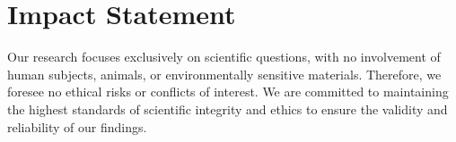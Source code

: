 \section*{Impact Statement}
Our research focuses exclusively on scientific questions, with no involvement of human subjects, animals, or environmentally sensitive materials. Therefore, we foresee no ethical risks or conflicts of interest. We are committed to maintaining the highest standards of scientific integrity and ethics to ensure the validity and reliability of our findings.

